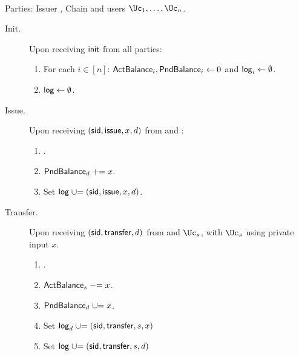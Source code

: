 \begin{functionality}\label{func:ConfidentialTransactions}~
	
	\item[Parties:]	Issuer \Ic, Chain \Cc and users  $\Uc_1, \ldots,\Uc_n$.
	
	\begin{description}
		\item[Init.] Upon receiving $\mathsf{init}$ from  all parties: 
		\begin{enumerate}
			\item  For each $i\in [n]$:  $\mathsf{ActBalance}_i,\mathsf{PndBalance}_i \leftarrow 0$ and  $\mathsf{log}_i \leftarrow \emptyset$.
			
			\item  $\mathsf{log} \leftarrow \emptyset$.
		\end{enumerate}
		
			\item[Issue.]   Upon receiving $(\mathsf{sid},\mathsf{issue},x,d)$ from  \Cc and \Ic:
		\begin{enumerate}
			
			
			\item {}.
			
			\item $\mathsf{PndBalance}_d \mathrel{+}= x$.
			
			\item Set $\mathsf{log} \mathrel{\cup}= {(\mathsf{sid},\mathsf{issue},x,d)}$.
		\end{enumerate}
		
		
		\item[Transfer.]    Upon receiving  $(\mathsf{sid},\mathsf{transfer},d)$ from  \Cc and  $\Uc_s$, with  $\Uc_s$ using private input $x$. 
		
	
		\begin{enumerate}
			\item {}.
			
			\item $\mathsf{ActBalance}_s \mathrel{-}= x$.
			
			\item   $\mathsf{PndBalance}_d \mathrel{\cup}= x$.
			
			\item Set $\mathsf{log}_d \mathrel{\cup}= {(\mathsf{sid},\mathsf{transfer},s,x)}$
			
			\item Set $\mathsf{log} \mathrel{\cup}= {(\mathsf{sid},\mathsf{transfer},s,d)}$
			
		\end{enumerate}
		

\end{description}
\end{functionality}
